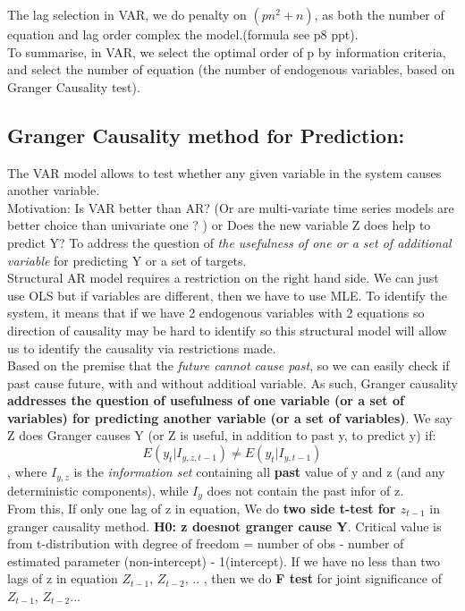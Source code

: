 \documentclass[12pt]{article}
\begin{document}
The lag selection in VAR, we do penalty on $(p n^2 +n)$, as both the number of equation and lag order complex the model.(formula see p8 ppt). 
\\

To summarise, in VAR, we select  the optimal order of p by information criteria, and select the number of equation (the number of endogenous variables, based on Granger Causality test).
\\

{\color{RoyalBlue}
\subsection{Granger Causality method for Prediction: }}
The VAR model allows to test whether any given variable in the system causes another variable.\\

\noindent
Motivation: Is VAR better than AR? (Or are multi-variate time series models are better choice than univariate one ? ) or Does the new variable Z does help to predict Y? To address the question of \textit{the usefulness of one or a set of additional variable } for predicting Y or a set of targets.\\

Structural AR model requires a restriction on the right hand side. We can just use OLS but if variables are different, then we have to use MLE. To identify the system, it means that if we have 2 endogenous variables with 2 equations so direction of causality may be hard to identify so this structural model will allow us to identify the causality via restrictions made.
\\

Based on the premise that the \textit{future cannot cause past}, so we can easily check if past cause future, with and without additioal variable. As such, Granger causality \textbf{addresses the question of usefulness of one variable (or a set of variables) for predicting another variable (or a set of variables)}. We say Z does Granger causes Y (or Z is useful, in addition to past y, to predict y) if:
\begin{equation}
    E(y_t|I_{y,z,t-1}) \ne E(y_t|I_{y,t-1})
\end{equation}, where $I_{y,z}$ is the \textit{information set} containing all \textbf{past} value of y and z (and any deterministic components), while $I_{y}$ does not contain the past infor of z.\\

From this,  If only one lag of z in equation, We do \textbf{two side t-test for $z_{t-1}$} in granger causality method. \textbf{H0: z doesnot granger cause Y}. Critical value is from t-distribution with degree of freedom = number of obs - number of estimated parameter (non-intercept) - 1(intercept). If we have no less than two lags of z in equation $Z_{t-1}$, $Z_{t-2}$, .. , then we do \textbf{F test} for joint significance of $Z_{t-1}$, $Z_{t-2}$... 
\\
\end{document}
